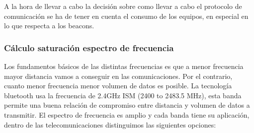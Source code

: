 \documentclass[a4paper ,12pt, onecolumn]{article}
\begin{document}
            A la hora de llevar a cabo la decisión sobre como llevar a cabo el protocolo de comunicación se ha de tener en cuenta 
            el consumo de los equipos, en especial en lo que respecta a los beacons.

        \subsubsection{Cálculo saturación espectro de frecuencia}
            Los fundamentos básicos de las distintas frecuencias es que a menor frecuencia mayor distancia vamos a conseguir 
            en las comunicaciones. Por el contrario, cuanto menor frecuencia menor volumen de datos es posible.
            La tecnología bluetooth usa la frecuencia de 2.4GHz ISM (2400 to 2483.5 MHz), esta banda permite una buena relación
            de compromiso entre distancia y volumen de datos a transmitir.
            El espectro de frecuencia es amplio y cada banda tiene su aplicación, dentro de las telecomunicaciones
            distinguimos las siguientes opciones:
\end{document}
